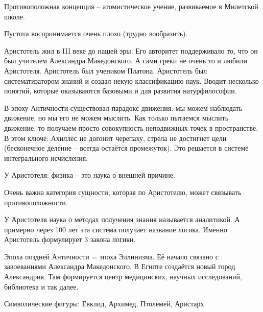\documentclass[main.tex]{subfiles}
\begin{document}
Противоположная концепция -- атомистическое учение, развиваемое в Милетской школе.

Пустота воспринимается очень плохо (трудно вообразить).



Аристотель жил в III веке до нашей эры.
Его авторитет поддерживало то, что он был учителем Александра Македонского.
А сами греки не очень то и любили Аристотеля.
Аристотель был учеником Платона.
Аристотель был систематизатором знаний и создал некую классификацию наук.
Вводит несколько понятий, которые оказываются базовыми и для развития натурфилософии.

В эпоху Античности существовал парадокс движения: мы можем наблюдать движение, но мы его не можем мыслить.
Как только пытаемся мыслить движение, то получаем просто совокупность неподвижных точек в пространстве.
В этом ключе: Ахиллес не догонит черепаху, стрела не достигнет цели (бесконечное деление -- всегда остаётся промежуток).
Это решается в системе интегрального исчисления.

У Аристотеля: физика -- это наука о внешней причине.





Очень важна категория сущности, которая по Аристотелю, может связывать противоположности.

У Аристотеля наука о методах получения знания называется аналитикой.
А примерно через 100 лет эта система получает название логика.
Именно Аристотель формулирует 3 закона логики.



Эпоха поздней Античности = эпоха Эллинизма.
Её начало связано с завоеваниями Александра Македонского.
В Египте создаётся новый город Александрия.
Там формируется центр медицинских, научных исследований, библиотека и так далее.

Символические фигуры: Евклид, Архимед, Птолемей, Аристарх.


\end{document}
